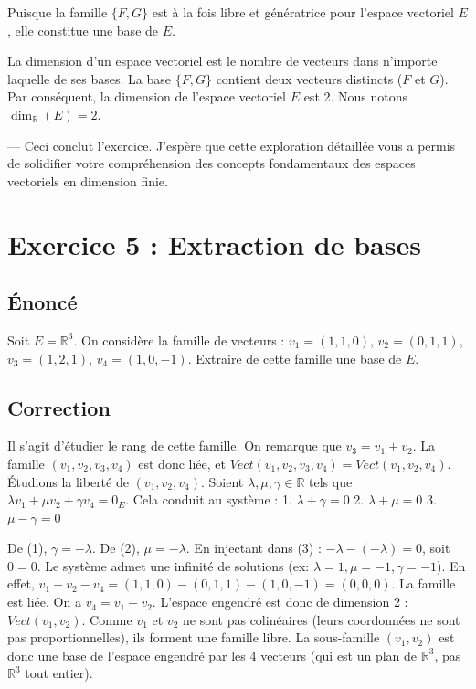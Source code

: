 \documentclass{report}
\begin{document}
Puisque la famille $\{F, G\}$ est à la fois libre et génératrice pour l'espace vectoriel $E$, elle constitue une base de $E$.

La dimension d'un espace vectoriel est le nombre de vecteurs dans n'importe laquelle de ses bases.
La base $\{F, G\}$ contient deux vecteurs distincts ($F$ et $G$).
Par conséquent, la dimension de l'espace vectoriel $E$ est 2.
Nous notons $\dim_{\mathbb{R}}(E) = 2$.

---
Ceci conclut l'exercice. J'espère que cette exploration détaillée vous a permis de solidifier votre compréhension des concepts fondamentaux des espaces vectoriels en dimension finie.

\newpage


\chapter*{Exercice 5 : Extraction de bases}

\section*{Énoncé}
Soit $E = \mathbb{R}^3$. On considère la famille de vecteurs :
$v_1 = (1, 1, 0)$, $v_2 = (0, 1, 1)$, $v_3 = (1, 2, 1)$, $v_4 = (1, 0, -1)$.
Extraire de cette famille une base de $E$.

\section*{Correction}
Il s'agit d'étudier le rang de cette famille.
On remarque que $v_3 = v_1 + v_2$. La famille $(v_1, v_2, v_3, v_4)$ est donc liée, et $Vect(v_1, v_2, v_3, v_4) = Vect(v_1, v_2, v_4)$.
Étudions la liberté de $(v_1, v_2, v_4)$.
Soient $\lambda, \mu, \gamma \in \mathbb{R}$ tels que $\lambda v_1 + \mu v_2 + \gamma v_4 = 0_E$.
Cela conduit au système :
1. $\lambda + \gamma = 0$
2. $\lambda + \mu = 0$
3. $\mu - \gamma = 0$

De (1), $\gamma = -\lambda$. De (2), $\mu = -\lambda$.
En injectant dans (3) : $-\lambda - (-\lambda) = 0$, soit $0 = 0$.
Le système admet une infinité de solutions (ex: $\lambda = 1, \mu = -1, \gamma = -1$).
En effet, $v_1 - v_2 - v_4 = (1,1,0) - (0,1,1) - (1,0,-1) = (0,0,0)$.
La famille est liée. On a $v_4 = v_1 - v_2$.
L'espace engendré est donc de dimension 2 : $Vect(v_1, v_2)$.
Comme $v_1$ et $v_2$ ne sont pas colinéaires (leurs coordonnées ne sont pas proportionnelles), ils forment une famille libre.
La sous-famille $(v_1, v_2)$ est donc une base de l'espace engendré par les 4 vecteurs (qui est un plan de $\mathbb{R}^3$, pas $\mathbb{R}^3$ tout entier).
\end{document}

